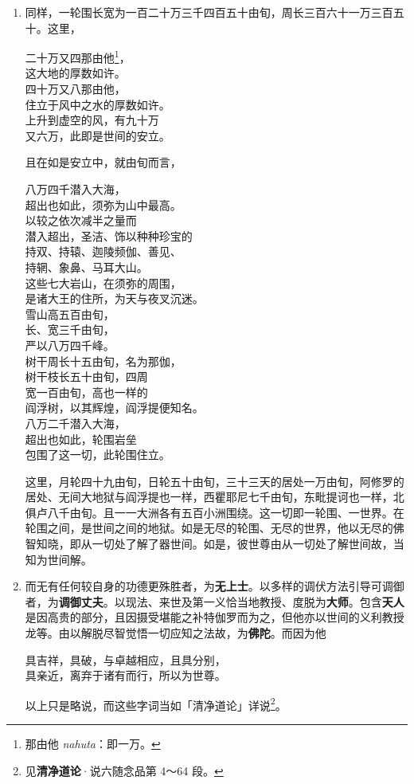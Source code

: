 \begin{enumerate}
\item 同样，一轮围长宽为一百二十万三千四百五十由旬，周长三百六十一万三百五十。这里，\begin{quoting}二十万又四那由他\footnote{那由他 \textit{nahuta}：即一万。}，\\这大地的厚数如许。\\四十万又八那由他，\\住立于风中之水的厚数如许。\\上升到虚空的风，有九十万\\又六万，此即是世间的安立。\end{quoting}且在如是安立中，就由旬而言，\begin{quoting}八万四千潜入大海，\\超出也如此，须弥为山中最高。\\以较之依次减半之量而\\潜入超出，圣洁、饰以种种珍宝的\\持双、持辕、迦陵频伽、善见、\\持辋、象鼻、马耳大山。\\这些七大岩山，在须弥的周围，\\是诸大王的住所，为天与夜叉沉迷。\\雪山高五百由旬，\\长、宽三千由旬，\\严以八万四千峰。\\树干周长十五由旬，名为那伽，\\树干枝长五十由旬，四周\\宽一百由旬，高也一样的\\阎浮树，以其辉煌，阎浮提便知名。\\八万二千潜入大海，\\超出也如此，轮围岩垒\\包围了这一切，此轮围住立。\end{quoting}这里，月轮四十九由旬，日轮五十由旬，三十三天的居处一万由旬，阿修罗的居处、无间大地狱与阎浮提也一样，西瞿耶尼七千由旬，东毗提诃也一样，北俱卢八千由旬。且一一大洲各有五百小洲围绕。这一切即一轮围、一世界。在轮围之间，是世间之间的地狱。如是无尽的轮围、无尽的世界，他以无尽的佛智知晓，即从一切处了解了器世间。如是，彼世尊由从一切处了解世间故，当知为世间解。
\item 而无有任何较自身的功德更殊胜者，为\textbf{无上士}。以多样的调伏方法引导可调御者，为\textbf{调御丈夫}。以现法、来世及第一义恰当地教授、度脱为\textbf{大师}。包含\textbf{天人}是因高贵的部分，且因摄受堪能之补特伽罗而为之，但他亦以世间的义利教授龙等。由以解脱尽智觉悟一切应知之法故，为\textbf{佛陀}。而因为他\begin{quoting}具吉祥，具破，与卓越相应，且具分别，\\具亲近，离弃于诸有而行，所以为世尊。\end{quoting}以上只是略说，而这些字词当如「清净道论」详说\footnote{见\textbf{清净道论}·说六随念品第 4～64 段。}。

\end{enumerate}
